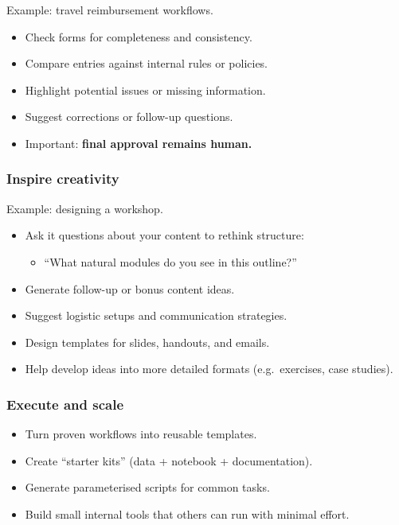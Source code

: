 \documentclass[
  letterpaper,
  DIV=11,
  numbers=noendperiod]{scrreprt}
\providecommand{\tightlist}{%
  \setlength{\itemsep}{0pt}\setlength{\parskip}{0pt}}
\begin{document}
Example: travel reimbursement workflows.

\begin{itemize}
\tightlist
\item
  Check forms for completeness and consistency.
\item
  Compare entries against internal rules or policies.
\item
  Highlight potential issues or missing information.
\item
  Suggest corrections or follow-up questions.
\item
  Important: \textbf{final approval remains human.}
\end{itemize}

\subsubsection{Inspire creativity}\label{inspire-creativity}

Example: designing a workshop.

\begin{itemize}
\tightlist
\item
  Ask it questions about your content to rethink structure:

  \begin{itemize}
  \tightlist
  \item
    ``What natural modules do you see in this outline?''
  \end{itemize}
\item
  Generate follow-up or bonus content ideas.
\item
  Suggest logistic setups and communication strategies.
\item
  Design templates for slides, handouts, and emails.
\item
  Help develop ideas into more detailed formats (e.g.~exercises, case
  studies).
\end{itemize}

\subsubsection{Execute and scale}\label{execute-and-scale}

\begin{itemize}
\tightlist
\item
  Turn proven workflows into reusable templates.
\item
  Create ``starter kits'' (data + notebook + documentation).
\item
  Generate parameterised scripts for common tasks.
\item
  Build small internal tools that others can run with minimal effort.
\end{itemize}
\end{document}

